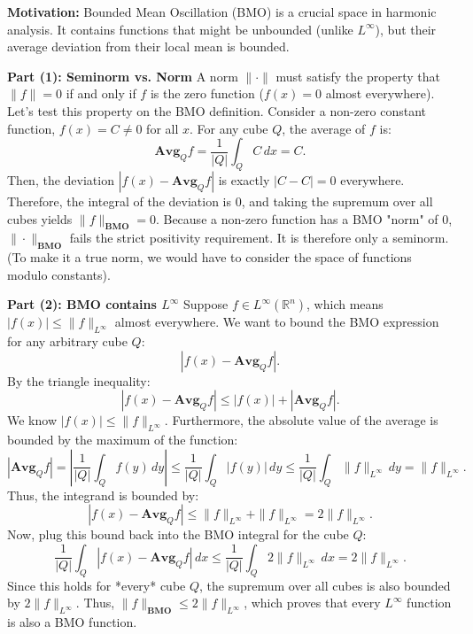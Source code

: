 \begin{solution}
\textbf{Motivation:} Bounded Mean Oscillation (BMO) is a crucial space in harmonic analysis. It contains functions that might be unbounded (unlike $L^\infty$), but their average deviation from their local mean is bounded.

\textbf{Part (1): Seminorm vs. Norm}
A norm $\|\cdot\|$ must satisfy the property that $\|f\| = 0$ if and only if $f$ is the zero function ($f(x) = 0$ almost everywhere).
Let's test this property on the BMO definition. Consider a non-zero constant function, $f(x) = C \neq 0$ for all $x$.
For any cube $Q$, the average of $f$ is:
\[
\mathbf{Avg}_Q f = \frac{1}{|Q|} \int_Q C \,dx = C.
\]
Then, the deviation $|f(x) - \mathbf{Avg}_Q f|$ is exactly $|C - C| = 0$ everywhere.
Therefore, the integral of the deviation is 0, and taking the supremum over all cubes yields $\|f\|_{\mathbf{BMO}} = 0$.
Because a non-zero function has a BMO "norm" of 0, $\|\cdot\|_{\mathbf{BMO}}$ fails the strict positivity requirement. It is therefore only a seminorm. (To make it a true norm, we would have to consider the space of functions modulo constants).

\textbf{Part (2): BMO contains $L^\infty$}
Suppose $f \in L^\infty(\mathbb{R}^n)$, which means $|f(x)| \leq \|f\|_{L^\infty}$ almost everywhere.
We want to bound the BMO expression for any arbitrary cube $Q$:
\[
|f(x) - \mathbf{Avg}_Q f|.
\]
By the triangle inequality:
\[
|f(x) - \mathbf{Avg}_Q f| \leq |f(x)| + |\mathbf{Avg}_Q f|.
\]
We know $|f(x)| \leq \|f\|_{L^\infty}$. Furthermore, the absolute value of the average is bounded by the maximum of the function:
\[
|\mathbf{Avg}_Q f| = \left| \frac{1}{|Q|} \int_Q f(y) \,dy \right| \leq \frac{1}{|Q|} \int_Q |f(y)| \,dy \leq \frac{1}{|Q|} \int_Q \|f\|_{L^\infty} \,dy = \|f\|_{L^\infty}.
\]
Thus, the integrand is bounded by:
\[
|f(x) - \mathbf{Avg}_Q f| \leq \|f\|_{L^\infty} + \|f\|_{L^\infty} = 2\|f\|_{L^\infty}.
\]
Now, plug this bound back into the BMO integral for the cube $Q$:
\[
\frac{1}{|Q|} \int_Q |f(x) - \mathbf{Avg}_Q f| \,dx \leq \frac{1}{|Q|} \int_Q 2\|f\|_{L^\infty} \,dx = 2\|f\|_{L^\infty}.
\]
Since this holds for *every* cube $Q$, the supremum over all cubes is also bounded by $2\|f\|_{L^\infty}$.
Thus, $\|f\|_{\mathbf{BMO}} \leq 2\|f\|_{L^\infty}$, which proves that every $L^\infty$ function is also a BMO function.


\end{solution}
